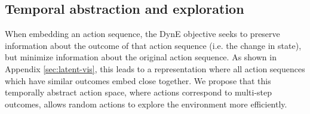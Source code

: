 
\subsection{Temporal abstraction and exploration}




When embedding an action sequence, the DynE objective seeks to preserve information about the outcome of that action sequence (i.e. the change in state), but minimize information about the original action sequence.
As shown in Appendix \ref{sec:latent-vis}, this leads to a representation where all action sequences which have similar outcomes embed close together.
We propose that this temporally abstract action space, where actions correspond to multi-step outcomes, allows random actions to explore the environment more efficiently.

